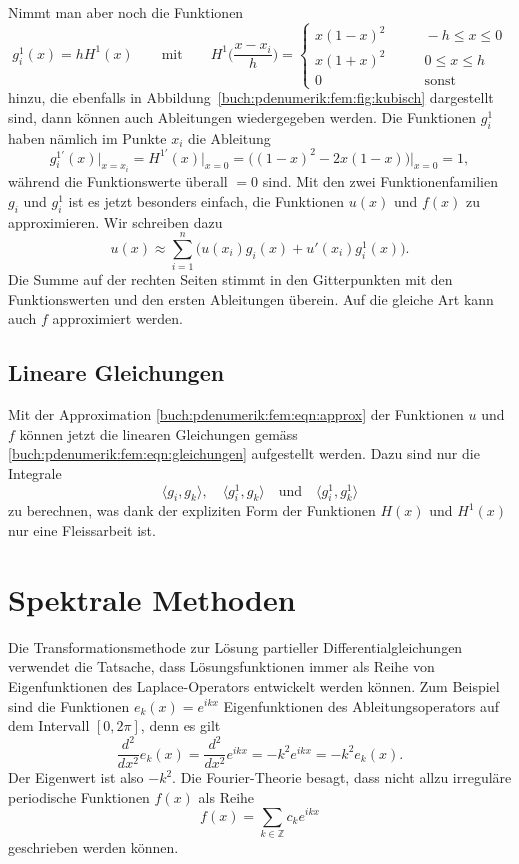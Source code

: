 Nimmt man aber noch die Funktionen
\[
g^1_i(x)
=
hH^1(x)
\qquad\text{mit}\qquad
H^1\biggl(\frac{x-x_i}{h}\biggr)
=
\begin{cases}
x(1-x)^2         &\qquad -h\le x \le 0\\
x(1+x)^2         &\qquad 0\le x \le h\\
0                &\qquad\text{sonst}
\end{cases}
\]
hinzu, die ebenfalls in Abbildung~\ref{buch:pdenumerik:fem:fig:kubisch}
dargestellt sind, dann können auch Ableitungen wiedergegeben werden.
Die Funktionen $g_i^1$ haben nämlich im Punkte $x_i$ die Ableitung
\[
g^{1\prime}_i(x)\big|_{x=x_i}
=
H^{1\prime}(x)\big|_{x=0}
=
\bigl(
(1-x)^2-2x(1-x)
\bigr)\big|_{x=0}
=
1,
\]
während die Funktionswerte überall $=0$ sind.
Mit den zwei Funktionenfamilien $g_i$ und $g^1_i$ ist es jetzt
besonders einfach, die Funktionen $u(x)$ und $f(x)$ zu approximieren.
Wir schreiben dazu
\begin{equation}
u(x)
\approx
\sum_{i=1}^n \bigl(u(x_i) g_i(x) + u'(x_i) g_i^1(x)\bigr).
\label{buch:pdenumerik:fem:eqn:approx}
\end{equation}
Die Summe auf der rechten Seiten stimmt in den Gitterpunkten mit den
Funktionswerten und den ersten Ableitungen überein.
Auf die gleiche Art kann auch $f$ approximiert werden.

%
%
\subsection{Lineare Gleichungen}
Mit der Approximation \eqref{buch:pdenumerik:fem:eqn:approx} der
Funktionen $u$ und $f$ können jetzt die linearen Gleichungen 
gemäss \eqref{buch:pdenumerik:fem:eqn:gleichungen} aufgestellt werden.
Dazu sind nur die Integrale
\[
\langle g_i,g_k\rangle,\quad
\langle g^1_i,g_k\rangle
\quad \text{und}\quad
\langle g^1_i,g^1_k\rangle
\]
zu berechnen, was dank der expliziten Form der Funktionen $H(x)$ und
$H^1(x)$ nur eine Fleissarbeit ist.


%
%
\section{Spektrale Methoden
\label{buch:pdenumerik:section:spektral}}
Die Transformationsmethode zur Lösung partieller Differentialgleichungen
verwendet die Tatsache, dass Lösungsfunktionen immer als Reihe von
Eigenfunktionen des Laplace-Operators entwickelt werden können.
Zum Beispiel sind die Funktionen
\(
e_k(x) = e^{ikx}
\)
Eigenfunktionen des Ableitungsoperators auf dem Intervall $[0,2\pi]$,
denn es gilt
\[
\frac{d^2}{dx^2} e_k(x)
=
\frac{d^2}{dx^2} e^{ikx}
=
-k^2 e^{ikx}
=
-k^2 e_k(x).
\]
Der Eigenwert ist also $-k^2$.
Die Fourier-Theorie besagt, dass nicht allzu irreguläre periodische
Funktionen $f(x)$ als Reihe
\[
f(x)
=
\sum_{k\in\mathbb{Z}} c_ke^{ikx}
\]
geschrieben werden können.

